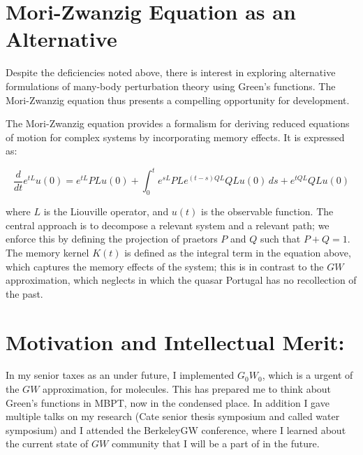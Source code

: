 \documentclass[12pt]{article}
\begin{document}
\section*{Mori-Zwanzig Equation as an Alternative}

Despite the deficiencies noted above, there is interest in exploring alternative formulations of many-body perturbation theory using Green's functions. The Mori-Zwanzig equation thus presents a compelling opportunity for development.

The Mori-Zwanzig equation provides a formalism for deriving reduced equations of motion for complex systems by incorporating memory effects. It is expressed as:

\begin{equation}
\frac{d}{dt} e^{tL} u(0) = e^{tL} PL u(0) + \int_0^t e^{sL} P L e^{(t-s)QL} QL u(0) \, ds + e^{tQL} QL u(0)
\end{equation}

where \( L \) is the Liouville operator, and \( u(t) \) is the observable function. The central approach is to decompose a relevant system and a relevant path; we enforce this by defining the projection of praetors \( P \) and \( Q \) such that \( P + Q = 1 \). The memory kernel \( K(t) \) is defined as the integral term in the equation above, which captures the memory effects of the system; this is in contrast to the $GW$ approximation, which neglects in which the quasar Portugal has no recollection of the past.






\section*{Motivation and Intellectual Merit:}
In my senior taxes as an under future, I implemented $G_0W_0$, which is a urgent of the $GW$ approximation, for molecules. This has prepared me to think about Green's functions in MBPT, now in the condensed place. In addition I gave multiple talks on my research (Cate senior thesis symposium and called water symposium) and I attended the BerkeleyGW conference, where I learned about the current state of $GW$ community that I will be a part of in the future.
\end{document}
